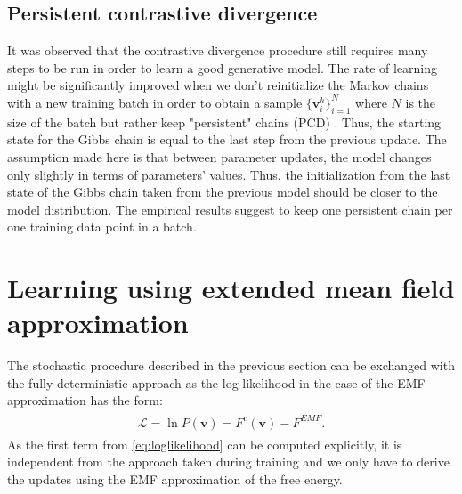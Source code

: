 \subsection{Persistent contrastive divergence}  
It was observed that the contrastive divergence procedure still requires many steps to be run in order to learn a good generative model. The rate of learning might be significantly improved when we don't reinitialize the Markov chains with a new training batch in order to obtain a sample $\{\mathbf{v}_i^k\}_{i=1}^N$ where $N$ is the size of the batch but rather keep "persistent" chains (PCD) \cite{tieleman2008training}. Thus, the starting state for the Gibbs chain is equal to the last step from the previous update. The assumption made here is that between parameter updates, the model changes only slightly in terms of parameters' values\cite{neal1992connectionist}. Thus, the initialization from the last state of the Gibbs chain taken from the previous model should be closer to the model distribution. The empirical results suggest to keep one persistent chain per one training data point in a batch.

\section{Learning using extended mean field approximation}
The stochastic procedure described in the previous section can be exchanged with the fully deterministic approach as the log-likelihood in the case of the EMF approximation has the form:
\begin{align}
\begin{split}
\mathcal{L} = \ln P(\mathbf{v}) = F^c(\mathbf{v}) - F^{EMF}.
\end{split}
\label{eq:emfLL}
\end{align}
As the first term from \ref{eq:loglikelihood} can be computed explicitly, it is independent from the approach taken during training and we only have to derive the updates using the EMF approximation of the free energy.

